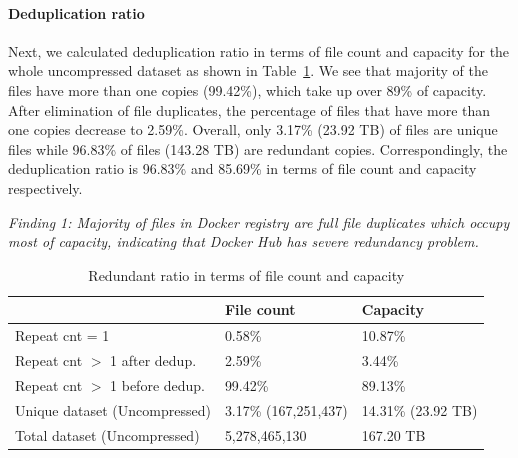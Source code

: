 \paragraph{Deduplication ratio}
Next, we calculated deduplication ratio in terms of file count and capacity for the whole uncompressed dataset as shown in Table~\ref{tbl:overall-redundant_ratio}.
We see that majority of the files have more than one copies (99.42\%), which take up over 89\% of capacity. After elimination of file duplicates, the percentage of files that have more than one copies decrease to 2.59\%. Overall, only 3.17\% (23.92 TB) of files are unique files while 96.83\% of files (143.28 TB) are redundant copies. Correspondingly, the deduplication ratio is 96.83\% and 85.69\% in terms of file count and capacity respectively.

\textit{Finding 1: Majority of files in Docker registry are full file duplicates which occupy most of capacity, indicating that Docker Hub has severe redundancy problem.}


\begin{table} 
	\centering 
	\scriptsize  
	\caption{Redundant ratio in terms of file count and capacity} \label{tbl:overall-redundant_ratio} 
	\begin{tabular}{|l|l|l|}%
		\hline  
		       & File count & Capacity \\
		\hline
		Repeat cnt = 1 & 0.58\% & 10.87\%\\
		\hline
		Repeat cnt $>$ 1 after dedup. & 2.59\% & 3.44\%\\
		\hline
		Repeat cnt $>$ 1 before dedup.  & 99.42\%  & 89.13\%\\
		\hline
		Unique dataset (Uncompressed) & 3.17\% (167,251,437)  &  14.31\% (23.92 TB) \\
		\hline 
		Total dataset (Uncompressed) & 5,278,465,130 & 167.20 TB \\
		\hline 	
	\end{tabular} 
\end{table} 

